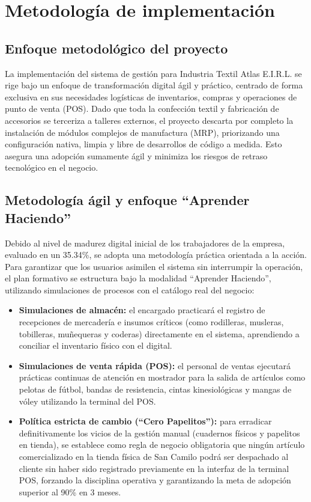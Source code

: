 \section{Metodología de implementación}

\subsection{Enfoque metodológico del proyecto}
\begin{indentedsubsection}
La implementación del sistema de gestión para Industria Textil Atlas E.I.R.L. se rige bajo un enfoque de transformación digital ágil y práctico, centrado de forma exclusiva en sus necesidades logísticas de inventarios, compras y operaciones de punto de venta (POS). Dado que toda la confección textil y fabricación de accesorios se terceriza a talleres externos, el proyecto descarta por completo la instalación de módulos complejos de manufactura (MRP), priorizando una configuración nativa, limpia y libre de desarrollos de código a medida. Esto asegura una adopción sumamente ágil y minimiza los riesgos de retraso tecnológico en el negocio.
\end{indentedsubsection}

\subsection{Metodología ágil y enfoque ``Aprender Haciendo''}
\begin{indentedsubsection}
Debido al nivel de madurez digital inicial de los trabajadores de la empresa, evaluado en un 35.34\%, se adopta una metodología práctica orientada a la acción. Para garantizar que los usuarios asimilen el sistema sin interrumpir la operación, el plan formativo se estructura bajo la modalidad ``Aprender Haciendo'', utilizando simulaciones de procesos con el catálogo real del negocio:

\begin{itemize}
    \item \textbf{Simulaciones de almacén:} el encargado practicará el registro de recepciones de mercadería e insumos críticos (como rodilleras, musleras, tobilleras, muñequeras y coderas) directamente en el sistema, aprendiendo a conciliar el inventario físico con el digital.
    \item \textbf{Simulaciones de venta rápida (POS):} el personal de ventas ejecutará prácticas continuas de atención en mostrador para la salida de artículos como pelotas de fútbol, bandas de resistencia, cintas kinesiológicas y mangas de vóley utilizando la terminal del POS.
    \item \textbf{Política estricta de cambio (``Cero Papelitos''):} para erradicar definitivamente los vicios de la gestión manual (cuadernos físicos y papelitos en tienda), se establece como regla de negocio obligatoria que ningún artículo comercializado en la tienda física de San Camilo podrá ser despachado al cliente sin haber sido registrado previamente en la interfaz de la terminal POS, forzando la disciplina operativa y garantizando la meta de adopción superior al 90\% en 3 meses.
\end{itemize}
\end{indentedsubsection}

